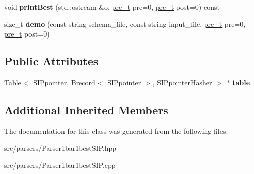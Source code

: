 \begin{DoxyCompactItemize}
void {\bfseries print\+Best} (std\+::ostream \&o, \mbox{\hyperlink{group__general_ga092fe8b972dfa977c2a0886720a7731e}{pre\+\_\+t}} pre=0, \mbox{\hyperlink{group__general_ga092fe8b972dfa977c2a0886720a7731e}{pre\+\_\+t}} post=0) const
\item 
\mbox{\label{classParser1bar1bestSIP_a442c2e51259da4acec2f4e38387ecc65}} 
size\+\_\+t {\bfseries demo} (const string schema\+\_\+file, const string input\+\_\+file, \mbox{\hyperlink{group__general_ga092fe8b972dfa977c2a0886720a7731e}{pre\+\_\+t}} pre=0, \mbox{\hyperlink{group__general_ga092fe8b972dfa977c2a0886720a7731e}{pre\+\_\+t}} post=0)
\end{DoxyCompactItemize}
\subsection*{Public Attributes}
\begin{DoxyCompactItemize}
\item 
\mbox{\label{classParser1bar1bestSIP_a8b4f76aec566e5168c75c42fa72d4c48}} 
\mbox{\hyperlink{classTable}{Table}}$<$ \mbox{\hyperlink{classSIPpointer}{S\+I\+Ppointer}}, \mbox{\hyperlink{classBrecord}{Brecord}}$<$ \mbox{\hyperlink{classSIPpointer}{S\+I\+Ppointer}} $>$, \mbox{\hyperlink{structSIPpointerHasher}{S\+I\+Ppointer\+Hasher}} $>$ $\ast$ {\bfseries table}
\end{DoxyCompactItemize}
\subsection*{Additional Inherited Members}


The documentation for this class was generated from the following files\+:\begin{DoxyCompactItemize}
\item 
src/parsers/Parser1bar1best\+S\+I\+P.\+hpp\item 
src/parsers/Parser1bar1best\+S\+I\+P.\+cpp\end{DoxyCompactItemize}
